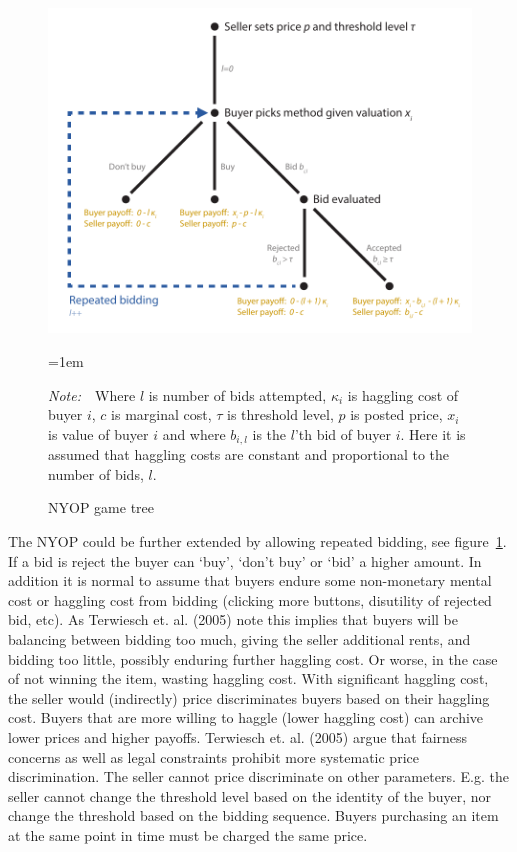 \documentclass[a4paper,12pt]{article}
\newcommand{\Figtext}[1]{%
	\begin{tablenotes}[para,flushleft]
		\hangindent=1em
		\footnotesize
		\raggedright
		#1
	\end{tablenotes}
}
\newcommand{\Fignote}[1]{\Figtext{\emph{Note:~}~#1}}
\begin{document}
	\begin{figure}
	        \centering
	        \caption{NYOP game tree}
	        \includegraphics[width=\textwidth]{Figures/NYOP_GameTree}
			\label{fig:game_tree}
			\Fignote{Where $l$ is number of bids attempted, $\kappa_i$ is haggling cost of buyer $i$, $c$ is marginal cost, $\tau$ is threshold level, $p$ is posted price, $x_i$ is value of buyer $i$ and where $b_{i,l}$ is the $l$'th bid of buyer $i$. Here it is assumed that haggling costs are constant and proportional to the number of bids, $l$.}
	\end{figure}
	
	The NYOP could be further extended by allowing repeated bidding, see figure~\ref{fig:game_tree}. If a bid is reject the buyer can `buy', `don't buy' or `bid' a higher amount. In addition it is normal to assume that buyers endure some non-monetary mental cost or haggling cost from bidding (clicking more buttons, disutility of rejected bid, etc). As Terwiesch et. al. (2005) note this implies that buyers will be balancing between bidding too much, giving the seller additional rents, and bidding too little, possibly enduring further haggling cost. Or worse, in the case of not winning the item, wasting haggling cost. With significant haggling cost, the seller would (indirectly) price discriminates buyers based on their haggling cost. Buyers that are more willing to haggle (lower haggling cost) can archive lower prices and higher payoffs. Terwiesch et. al. (2005) argue that fairness concerns as well as legal constraints prohibit more systematic price discrimination. The seller cannot price discriminate on other parameters. E.g. the seller cannot change the threshold level based on the identity of the buyer, nor change the threshold based on the bidding sequence. Buyers purchasing an item at the same point in time must be charged the same price.
\end{document}
